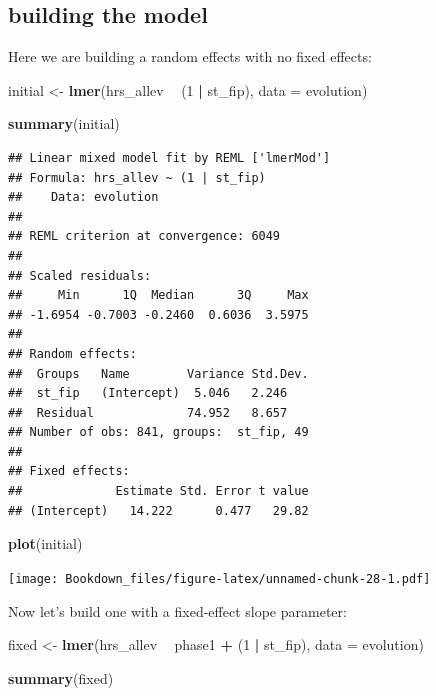 \documentclass[]{book}
\newenvironment{Shaded}{\begin{snugshade}}{\end{snugshade}}
\newcommand{\KeywordTok}[1]{\textcolor[rgb]{0.13,0.29,0.53}{\textbf{#1}}}
\newcommand{\DataTypeTok}[1]{\textcolor[rgb]{0.13,0.29,0.53}{#1}}
\newcommand{\DecValTok}[1]{\textcolor[rgb]{0.00,0.00,0.81}{#1}}
\newcommand{\StringTok}[1]{\textcolor[rgb]{0.31,0.60,0.02}{#1}}
\newcommand{\OperatorTok}[1]{\textcolor[rgb]{0.81,0.36,0.00}{\textbf{#1}}}
\newcommand{\NormalTok}[1]{#1}
\begin{document}
\subsection{building the model}\label{building-the-model}

Here we are building a random effects with no fixed effects:

\begin{Shaded}
\begin{Highlighting}[]
\NormalTok{initial <-}\StringTok{ }\KeywordTok{lmer}\NormalTok{(hrs_allev }\OperatorTok{~}\StringTok{ }\NormalTok{(}\DecValTok{1} \OperatorTok{|}\StringTok{ }\NormalTok{st_fip), }\DataTypeTok{data =}\NormalTok{ evolution)}

\KeywordTok{summary}\NormalTok{(initial)}
\end{Highlighting}
\end{Shaded}

\begin{verbatim}
## Linear mixed model fit by REML ['lmerMod']
## Formula: hrs_allev ~ (1 | st_fip)
##    Data: evolution
## 
## REML criterion at convergence: 6049
## 
## Scaled residuals: 
##     Min      1Q  Median      3Q     Max 
## -1.6954 -0.7003 -0.2460  0.6036  3.5975 
## 
## Random effects:
##  Groups   Name        Variance Std.Dev.
##  st_fip   (Intercept)  5.046   2.246   
##  Residual             74.952   8.657   
## Number of obs: 841, groups:  st_fip, 49
## 
## Fixed effects:
##             Estimate Std. Error t value
## (Intercept)   14.222      0.477   29.82
\end{verbatim}

\begin{Shaded}
\begin{Highlighting}[]
\KeywordTok{plot}\NormalTok{(initial)}
\end{Highlighting}
\end{Shaded}

\texttt{[image: Bookdown\_files/figure-latex/unnamed-chunk-28-1.pdf]}

Now let's build one with a fixed-effect slope parameter:

\begin{Shaded}
\begin{Highlighting}[]
\NormalTok{fixed <-}\StringTok{ }\KeywordTok{lmer}\NormalTok{(hrs_allev }\OperatorTok{~}\StringTok{ }\NormalTok{phase1 }\OperatorTok{+}\StringTok{ }\NormalTok{(}\DecValTok{1} \OperatorTok{|}\StringTok{ }\NormalTok{st_fip), }\DataTypeTok{data =}\NormalTok{ evolution)}

\KeywordTok{summary}\NormalTok{(fixed)}
\end{Highlighting}
\end{Shaded}
\end{document}
